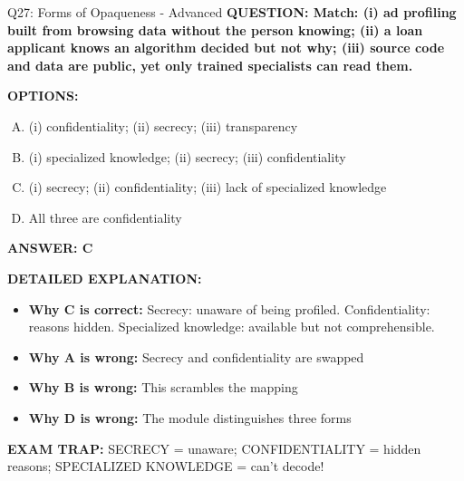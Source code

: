 \documentclass[8pt]{beamer}
\begin{document}
\begin{frame}[shrink=6]{Q27: Forms of Opaqueness - Advanced}
\fontsize{6.5}{7.5}\selectfont
\textbf{QUESTION: Match: (i) ad profiling built from browsing data without the person knowing; (ii) a loan applicant knows an algorithm decided but not why; (iii) source code and data are public, yet only trained specialists can read them.}

\vspace{0.1cm}
\textbf{OPTIONS:}
\begin{enumerate}[A.]
\item (i) confidentiality; (ii) secrecy; (iii) transparency
\item (i) specialized knowledge; (ii) secrecy; (iii) confidentiality
\item (i) secrecy; (ii) confidentiality; (iii) lack of specialized knowledge
\item All three are confidentiality
\end{enumerate}

\vspace{0.1cm}
\textcolor{myblue}{\textbf{ANSWER: C}}

\vspace{0.1cm}
\textbf{DETAILED EXPLANATION:}
\begin{itemize}
\item \textbf{Why C is correct:} Secrecy: unaware of being profiled. Confidentiality: reasons hidden. Specialized knowledge: available but not comprehensible.
\item \textbf{Why A is wrong:} Secrecy and confidentiality are swapped
\item \textbf{Why B is wrong:} This scrambles the mapping
\item \textbf{Why D is wrong:} The module distinguishes three forms
\end{itemize}

\textcolor{myred}{\textbf{EXAM TRAP:}} SECRECY = unaware; CONFIDENTIALITY = hidden reasons; SPECIALIZED KNOWLEDGE = can't decode!
\end{frame}
\end{document}

